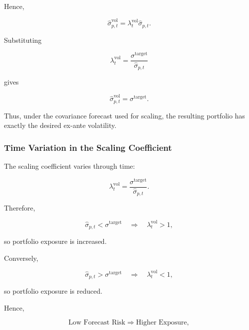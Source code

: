 \documentclass[11pt,a4paper]{article}
\begin{document}
Hence,

\begin{equation}
\widehat{\sigma}_{p,t}^{\mathrm{vol}}
=
\lambda_t^{\mathrm{vol}}
\widehat{\sigma}_{p,t}.
\end{equation}

Substituting

\begin{equation}
\lambda_t^{\mathrm{vol}}
=
\frac{
\sigma^{\mathrm{target}}
}{
\widehat{\sigma}_{p,t}
}
\end{equation}

gives

\begin{equation}
\boxed{
\widehat{\sigma}_{p,t}^{\mathrm{vol}}
=
\sigma^{\mathrm{target}}.
}
\end{equation}

Thus, under the covariance forecast used for scaling, the resulting portfolio
has exactly the desired ex-ante volatility.


\subsubsection{Time Variation in the Scaling Coefficient}

The scaling coefficient varies through time:

\begin{equation}
\lambda_t^{\mathrm{vol}}
=
\frac{
\sigma^{\mathrm{target}}
}{
\widehat{\sigma}_{p,t}
}.
\end{equation}

Therefore,

\begin{equation}
\widehat{\sigma}_{p,t}
<
\sigma^{\mathrm{target}}
\quad\Rightarrow\quad
\lambda_t^{\mathrm{vol}}>1,
\end{equation}

so portfolio exposure is increased.

Conversely,

\begin{equation}
\widehat{\sigma}_{p,t}
>
\sigma^{\mathrm{target}}
\quad\Rightarrow\quad
\lambda_t^{\mathrm{vol}}<1,
\end{equation}

so portfolio exposure is reduced.

Hence,

\begin{equation}
\boxed{
\text{Low Forecast Risk}
\Rightarrow
\text{Higher Exposure},
}
\end{equation}
\end{document}
